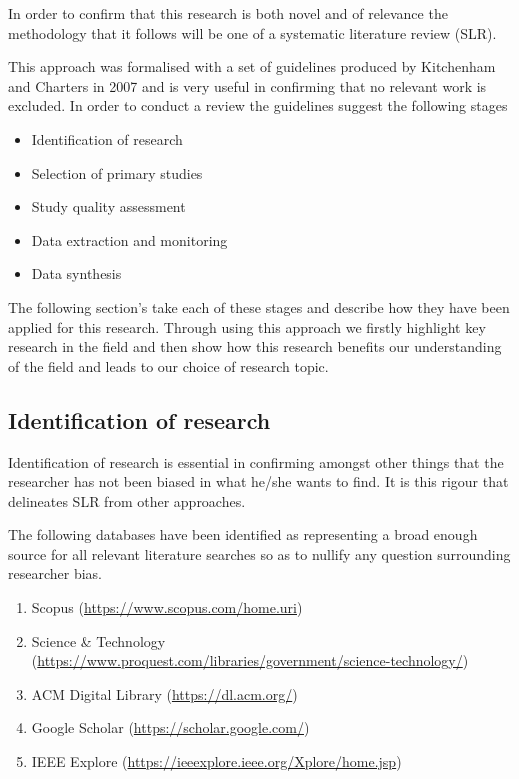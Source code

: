 \noindent
In order to confirm that this research is both novel and of relevance the methodology that it follows will be one of a systematic literature review (SLR).
\par
This approach was formalised with a set of guidelines produced by Kitchenham and Charters in 2007 and is very useful in confirming that no relevant work is excluded. In order to conduct a review the guidelines suggest the following stages

\begin{itemize}
  \item Identification of research %
  \item Selection of primary studies %
  \item Study quality assessment %
  \item Data extraction and monitoring %
  \item Data synthesis %
\end{itemize}

\noindent
The following section's take each of these stages and describe how they have been applied for this research. Through using this approach we firstly highlight key research in the field and then show how this research benefits our understanding of the field and leads to our choice of research topic.


\subsection{Identification of research}
Identification of research is essential in confirming amongst other things that the researcher has not been biased in what he/she wants to find. It is this rigour that delineates SLR from other approaches.
\par
The following databases have been identified as representing a broad enough source for all relevant literature searches so as to nullify any question surrounding researcher bias.

\begin{enumerate}
  \item Scopus (\href{https://www.scopus.com/home.uri}{https://www.scopus.com/home.uri})
  \item Science \& Technology\\ (\href{https://www.proquest.com/libraries/government/science-technology/}{https://www.proquest.com/libraries/government/science-technology/})
  \item ACM Digital Library (\href{https://dl.acm.org/}{https://dl.acm.org/})
  \item Google Scholar (\href{https://scholar.google.com/}{https://scholar.google.com/})
  \item IEEE Explore (\href{https://ieeexplore.ieee.org/Xplore/home.jsp}{https://ieeexplore.ieee.org/Xplore/home.jsp})
\end{enumerate}

